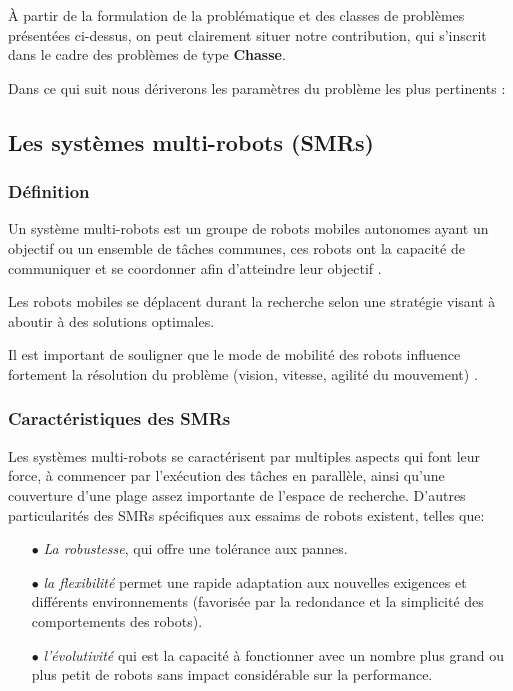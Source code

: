 À partir de la formulation de la problématique et des classes de problèmes présentées ci-dessus, on peut clairement situer notre contribution, qui s'inscrit dans le cadre des problèmes de type  \textbf{Chasse}. 

Dans ce qui suit nous dériverons les paramètres du problème les plus pertinents :


\subsection{Les systèmes multi-robots (SMRs)}

\subsubsection{Définition}
Un système multi-robots est un groupe de robots mobiles autonomes ayant un objectif ou un ensemble de tâches communes, ces robots ont la capacité de communiquer et se coordonner afin d'atteindre leur objectif \cite{SMR1}. 

Les robots mobiles se déplacent durant la recherche selon une stratégie visant à aboutir à des solutions optimales.

Il est important de souligner que le mode de mobilité des robots influence fortement la résolution du problème (vision, vitesse, agilité du mouvement) \cite{surv1}.



\subsubsection{Caractéristiques des SMRs \cite{surv1}}
Les systèmes multi-robots se caractérisent par multiples aspects qui font leur force, à commencer par l'exécution des tâches en parallèle, ainsi qu’une couverture d'une plage assez importante de l'espace de recherche. D'autres particularités des SMRs spécifiques aux essaims de robots existent, telles que:
\begin{itemize}
	\item[$\bullet$]\textit{La robustesse}, qui offre une tolérance aux pannes.
	
	\item[$\bullet$]\textit{la flexibilité} permet une rapide adaptation aux nouvelles exigences et différents environnements (favorisée par la redondance et la simplicité des comportements des robots).
	
	\item[$\bullet$]\textit{l'évolutivité} qui est la capacité à fonctionner avec un nombre plus grand ou plus petit de robots sans impact considérable sur la performance.
\end{itemize}

